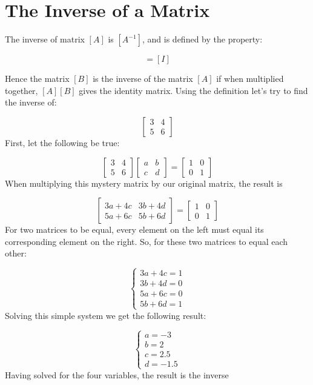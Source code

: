 \section{The Inverse of a Matrix}\label{the-inverse-of-a-matrix}

The inverse of matrix \([A]\) is \([A^{-1}]\), and is defined by the property:

\begin{equation} [A][A^{-1}]=[I] \end{equation}

Hence the matrix \([B]\) is the inverse of the matrix \([A]\) if when multiplied together, \([A][B]\) gives the identity matrix. 
Using the definition let's try to find the inverse of:

\[
\begin{bmatrix}
3 & 4\\
5 & 6
\end{bmatrix}
\]
First, let the following be true:

\[
\begin{bmatrix}
3 & 4\\
5 & 6
\end{bmatrix}
\begin{bmatrix}
a & b\\
c & d
\end{bmatrix}
=
\begin{bmatrix}
1 & 0\\
0 & 1
\end{bmatrix}
\]
When multiplying this mystery matrix by our original matrix, the result is

\[
\begin{bmatrix}
3a+4c & 3b+4d\\
5a+6c & 5b+6d
\end{bmatrix}
=
\begin{bmatrix}
1 & 0\\
0 & 1
\end{bmatrix}
\]
For two matrices to be equal, every element on the left must equal its corresponding element on the right. So, for these two matrices to equal each other:

\[
\begin{cases}
3a+4c=1\\
3b+4d=0\\
5a+6c=0\\
5b+6d=1
\end{cases}
\]
Solving this simple system we get the following result:

\[
\begin{cases}
a=−3\\
b=2\\
c=2.5\\
d=−1.5
\end{cases}
\]
Having solved for the four variables, the result is the inverse

